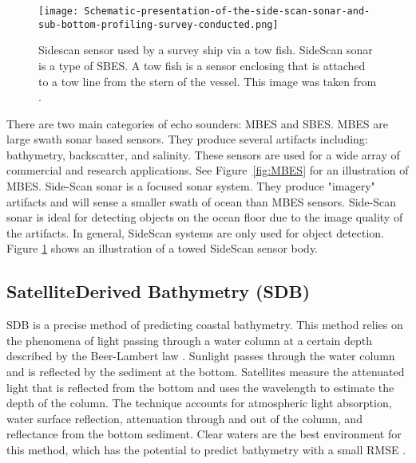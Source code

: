 \begin{figure}[htp]
    \centering
    \texttt{[image: Schematic-presentation-of-the-side-scan-sonar-and-sub-bottom-profiling-survey-conducted.png]}
    \caption{Sidescan sensor used by a survey ship via a tow fish.
    SideScan sonar is a type of \ac{SBES}.
    A tow fish is a sensor enclosing that is attached to a tow line from the stern of the vessel.
    This image was taken from \cite{sakellariou2015preliminary}.}
    \label{fig:sidescandemo}
\end{figure}


There are two main categories of echo sounders: \ac{MBES} and \ac{SBES}.
\ac{MBES} are large swath sonar based sensors.
They produce several artifacts including: bathymetry, backscatter, and salinity.
These sensors are used for a wide array of commercial and research applications.
See Figure~\ref{fig:MBES} for an illustration of \ac{MBES}.
Side-Scan sonar is a focused sonar system.
They produce "imagery" artifacts and will sense a smaller swath of ocean than \ac{MBES} sensors.
Side-Scan sonar is ideal for detecting objects on the ocean floor due to the image quality of the artifacts.
In general, SideScan systems are only used for object detection.
Figure \ref{fig:sidescandemo} shows an illustration of a towed SideScan sensor body.




\subsection{Satellite\-Derived Bathymetry (SDB)}
\ac{SDB} is a precise method of predicting coastal bathymetry. 
This method relies on the phenomena of light passing through a water column at a certain depth described by the Beer-Lambert law \cite{chybicki2018three}\cite{vinayaraj2016satellite}.
Sunlight passes through the water column and is reflected by the sediment at the bottom.
Satellites measure the attenuated light that is reflected from the bottom and uses the wavelength to estimate the depth of the column.
The technique accounts for atmospheric light absorption, water surface reflection, attenuation through and out of the column, and reflectance from the bottom sediment.
Clear waters are the best environment for this method, which has the potential to predict bathymetry with a small RMSE \cite{chybicki2018three}.



